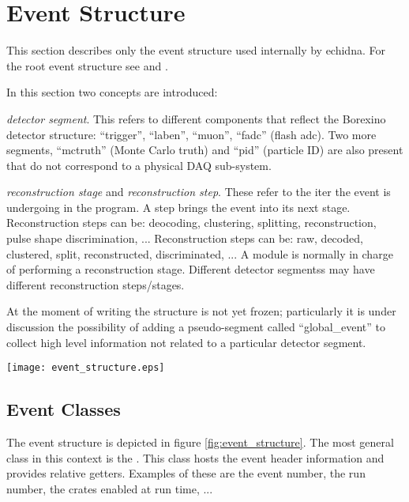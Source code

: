 \section{Event Structure}
\label{sec:event_structure}

This section describes only the event structure used internally by echidna.
For the root event structure see  and .

In this section two concepts are introduced:
\begin{description}
\item{\emph{detector segment}.}
This refers to different components that reflect the Borexino detector structure: ``trigger'', ``laben'', ``muon'', ``fadc'' (flash adc).
Two more segments, ``mctruth'' (Monte Carlo truth) and ``pid'' (particle ID) are also present that do not correspond to a physical DAQ sub-system.  
\item{\emph{reconstruction stage} and \emph{reconstruction step}.}
These refer to the iter the event is undergoing in the program. 
A step brings the event into its next stage.
Reconstruction steps can be: deocoding, clustering, splitting, reconstruction, pulse shape discrimination, ...
Reconstruction steps can be: raw, decoded, clustered, split, reconstructed, discriminated, ...
A module is normally in charge of performing a reconstruction stage.
Different detector segmentss may have different reconstruction steps/stages.
\end{description}

At the moment of writing the structure is not yet frozen; 
particularly it is under discussion the possibility of adding a pseudo-segment called ``global\_event'' 
to collect high level information not related to a particular detector segment.

\bfig
\texttt{[image: event\_structure.eps]}
\efig

\subsection{Event Classes}

The event structure is depicted in figure \ref{fig:event_structure}.
The most general class in this context is the .
This class hosts the event header information and provides relative getters.
Examples of these are the event number, the run number, the crates enabled at run time, ...


